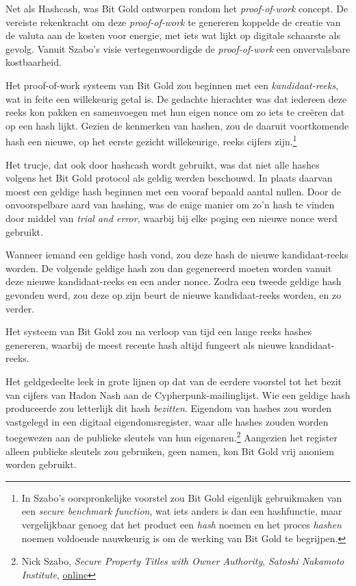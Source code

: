\documentclass[
  a5paper,
  smalldemyvopaper,11pt,twoside,onecolumn,openright,extrafontsizes,
hidelinks]{memoir}
\begin{document}
Net als Hashcash, was Bit Gold ontworpen rondom het \emph{proof-of-work}
concept. De vereiste rekenkracht om deze \emph{proof-of-work} te
genereren koppelde de creatie van de valuta aan de kosten voor energie,
met iets wat lijkt op digitale schaarste als gevolg. Vanuit Szabo's
visie vertegenwoordigde de \emph{proof-of-work} een onvervalsbare
kostbaarheid.

Het proof-of-work systeem van Bit Gold zou beginnen met een
\emph{kandidaat-reeks}, wat in feite een willekeurig getal is. De
gedachte hierachter was dat iedereen deze reeks kon pakken en
samenvoegen met hun eigen nonce om zo iets te creëren dat op een hash
lijkt. Gezien de kenmerken van hashen, zou de daaruit voortkomende hash
een nieuwe, op het eerste gezicht willekeurige, reeks cijfers
zijn.\footnote{In Szabo's oorspronkelijke voorstel zou Bit Gold
  eigenlijk gebruikmaken van een \emph{secure benchmark function}, wat
  iets anders is dan een hashfunctie, maar vergelijkbaar genoeg dat het
  product een \emph{hash} noemen en het proces \emph{hashen} noemen
  voldoende nauwkeurig is om de werking van Bit Gold te begrijpen.}

Het trucje, dat ook door hashcash wordt gebruikt, was dat niet alle
hashes volgens het Bit Gold protocol als geldig werden beschouwd. In
plaats daarvan moest een geldige hash beginnen met een vooraf bepaald
aantal nullen. Door de onvoorspelbare aard van hashing, was de enige
manier om zo'n hash te vinden door middel van \emph{trial and error},
waarbij bij elke poging een nieuwe nonce werd gebruikt.

Wanneer iemand een geldige hash vond, zou deze hash de nieuwe
kandidaat-reeks worden. De volgende geldige hash zou dan gegenereerd
moeten worden vanuit deze nieuwe kandidaat-reeks en een ander nonce.
Zodra een tweede geldige hash gevonden werd, zou deze op zijn beurt de
nieuwe kandidaat-reeks worden, en zo verder.

Het systeem van Bit Gold zou na verloop van tijd een lange reeks hashes
genereren, waarbij de meest recente hash altijd fungeert als nieuwe
kandidaat-reeks.

Het geldgedeelte leek in grote lijnen op dat van de eerdere voorstel tot
het bezit van cijfers van Hadon Nash aan de Cypherpunk-mailinglijst. Wie
een geldige hash produceerde zou letterlijk dit hash \emph{bezitten}.
Eigendom van hashes zou worden vastgelegd in een digitaal
eigendomsregister, waar alle hashes zouden worden toegewezen aan de
publieke sleutels van hun eigenaren.\footnote{Nick Szabo, \emph{Secure
  Property Titles with Owner Authority}, \emph{Satoshi Nakamoto
  Institute},
  \href{https://nakamotoinstitute.org/library/secure-property-titles/}{online}}
Aangezien het register alleen publieke sleutels zou gebruiken, geen
namen, kon Bit Gold vrij anoniem worden gebruikt.
\end{document}
